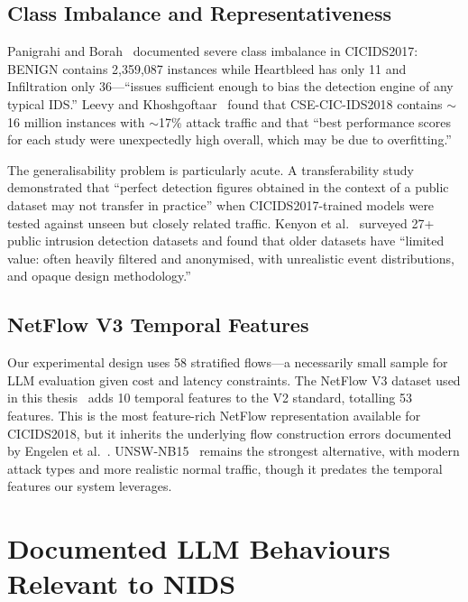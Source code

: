 \documentclass[12pt, a4paper, oneside]{report}
\begin{document}
\subsection{Class Imbalance and Representativeness}

Panigrahi and Borah~\cite{panigrahi2018cicids} documented severe class imbalance in
CICIDS2017: BENIGN contains 2,359,087 instances while Heartbleed has only 11 and
Infiltration only 36---``issues sufficient enough to bias the detection engine of
any typical IDS.'' Leevy and Khoshgoftaar~\cite{leevy2020survey} found that
CSE-CIC-IDS2018 contains $\sim$16 million instances with $\sim$17\% attack traffic
and that ``best performance scores for each study were unexpectedly high overall,
which may be due to overfitting.''

The generalisability problem is particularly acute. A transferability
study~\cite{transferability2022} demonstrated that ``perfect detection figures
obtained in the context of a public dataset may not transfer in practice'' when
CICIDS2017-trained models were tested against unseen but closely related traffic.
Kenyon et al.~\cite{kenyon2020datasets} surveyed 27+ public intrusion detection
datasets and found that older datasets have ``limited value: often heavily filtered
and anonymised, with unrealistic event distributions, and opaque design
methodology.''

\subsection{NetFlow V3 Temporal Features}

Our experimental design uses 58 stratified flows---a necessarily small sample for
LLM evaluation given cost and latency constraints. The NetFlow V3 dataset used in
this thesis~\cite{luay2025netflow} adds 10 temporal features to the V2
standard, totalling 53 features. This is the most feature-rich NetFlow
representation available for CICIDS2018, but it inherits the underlying flow
construction errors documented by Engelen et al.~\cite{engelen2021cicids}.
UNSW-NB15~\cite{moustafa2015unswnb15} remains the strongest alternative, with
modern attack types and more realistic normal traffic, though it predates the
temporal features our system leverages.


\section{Documented LLM Behaviours Relevant to NIDS}
\label{sec:llm-behaviours}
\end{document}
